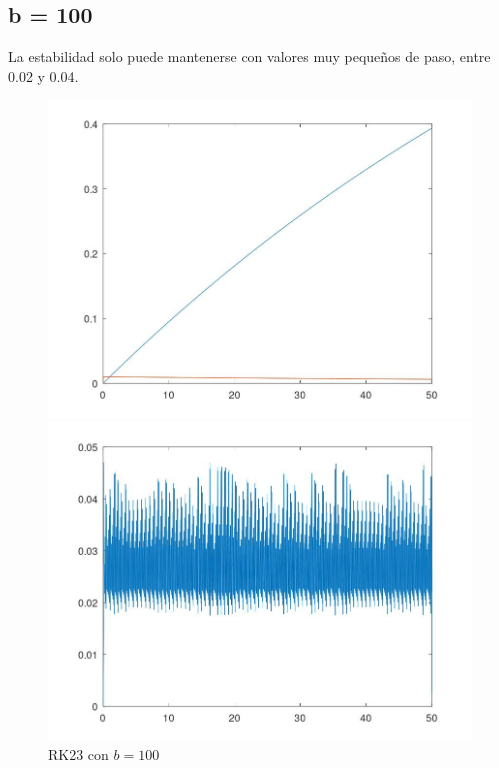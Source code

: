 \documentclass[a4paper,12pt]{article}
\begin{document}
\subsection*{b = 100}

La estabilidad solo puede mantenerse con valores muy pequeños de paso, entre 0.02 y 0.04.


\begin{figure}[H]
\centering
\begin{minipage}[b]{0.49\textwidth}
    \centering
    \includegraphics[width=\textwidth]{img/ej10_3.jpeg}
\end{minipage}
\hfill
\begin{minipage}[b]{0.49\textwidth}
    \centering
    \includegraphics[width=\textwidth]{img/ej10_4.jpeg}
\end{minipage}
\caption{RK23 con \( b = 100 \)}
\end{figure}
\end{document}
